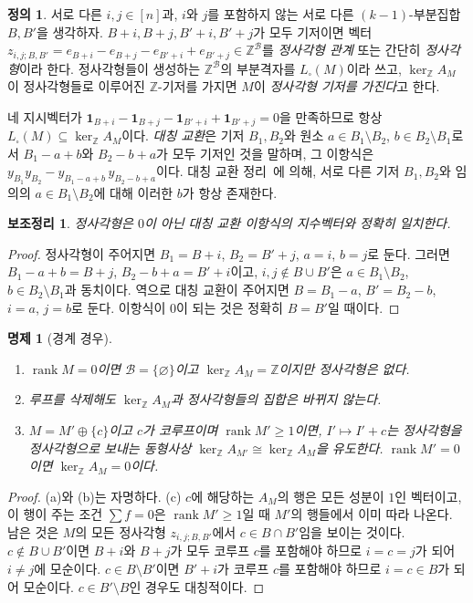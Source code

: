 \documentclass[11pt,a4paper]{article}
\theoremstyle{plain}
\newtheorem{lemma}[theorem]{보조정리}
\newtheorem{proposition}[theorem]{명제}
\theoremstyle{definition}
\newtheorem{definition}[theorem]{정의}
\newcommand{\Z}{\mathbb Z}
\newcommand{\AM}{A_M}
\newcommand{\kerZ}{\ker_{\Z}\!A_M}
\newcommand{\sq}{L_{\square}}
\newcommand{\bs}{\mathcal B}
\newcommand{\rank}{\operatorname{rank}}
\newcommand{\ind}{\mathbf 1}
\begin{document}
\begin{definition}\label{def:square}
서로 다른 $i,j\in[n]$과, $i$와 $j$를 포함하지 않는 서로 다른 $(k-1)$\nobreakdash-부분집합 $B,B'$을 생각하자. $B+i,B+j,B'+i,B'+j$가 모두 기저이면 벡터 $z_{i,j;B,B'}=e_{B+i}-e_{B+j}-e_{B'+i}+e_{B'+j}\in\Z^{\bs}$를 \emph{정사각형 관계} 또는 간단히 \emph{정사각형}이라 한다. 정사각형들이 생성하는 $\Z^{\bs}$의 부분격자를 $\sq(M)$이라 쓰고, $\kerZ$이 정사각형들로 이루어진 $\Z$\nobreakdash-기저를 가지면 $M$이 \emph{정사각형 기저를 가진다}고 한다.
\end{definition}
네 지시벡터가 $\ind_{B+i}-\ind_{B+j}-\ind_{B'+i}+\ind_{B'+j}=0$을 만족하므로 항상 $\sq(M)\subseteq\kerZ$이다. \emph{대칭 교환}은 기저 $B_1,B_2$와 원소 $a\in B_1\setminus B_2$, $b\in B_2\setminus B_1$로서 $B_1-a+b$와 $B_2-b+a$가 모두 기저인 것을 말하며, 그 이항식은 $y_{B_1}y_{B_2}-y_{B_1-a+b}\,y_{B_2-b+a}$이다. 대칭 교환 정리~\cite{Br69}에 의해, 서로 다른 기저 $B_1,B_2$와 임의의 $a\in B_1\setminus B_2$에 대해 이러한 $b$가 항상 존재한다.

\begin{lemma}\label{lem:sym}
정사각형은 $0$이 아닌 대칭 교환 이항식의 지수벡터와 정확히 일치한다.
\end{lemma}
\begin{proof}
정사각형이 주어지면 $B_1=B+i$, $B_2=B'+j$, $a=i$, $b=j$로 둔다. 그러면 $B_1-a+b=B+j$, $B_2-b+a=B'+i$이고, $i,j\notin B\cup B'$은 $a\in B_1\setminus B_2$, $b\in B_2\setminus B_1$과 동치이다. 역으로 대칭 교환이 주어지면 $B=B_1-a$, $B'=B_2-b$, $i=a$, $j=b$로 둔다. 이항식이 $0$이 되는 것은 정확히 $B=B'$일 때이다.
\end{proof}

\begin{proposition}[경계 경우]\label{prop:edge}
\begin{enumerate}[label=(\alph*),itemsep=1pt]
\item $\rank M=0$이면 $\bs=\{\varnothing\}$이고 $\kerZ=\Z$이지만 정사각형은 없다.
\item 루프를 삭제해도 $\kerZ$과 정사각형들의 집합은 바뀌지 않는다.
\item $M=M'\oplus\{c\}$이고 $c$가 코루프이며 $\rank M'\ge1$이면, $I'\mapsto I'+c$는 정사각형을 정사각형으로 보내는 동형사상 $\ker_\Z A_{M'}\cong\kerZ$을 유도한다. $\rank M'=0$이면 $\kerZ=0$이다.
\end{enumerate}
\end{proposition}
\begin{proof}
(a)와 (b)는 자명하다. (c) $c$에 해당하는 $\AM$의 행은 모든 성분이 $1$인 벡터이고, 이 행이 주는 조건 $\sum f=0$은 $\rank M'\ge1$일 때 $M'$의 행들에서 이미 따라 나온다. 남은 것은 $M$의 모든 정사각형 $z_{i,j;B,B'}$에서 $c\in B\cap B'$임을 보이는 것이다. $c\notin B\cup B'$이면 $B+i$와 $B+j$가 모두 코루프 $c$를 포함해야 하므로 $i=c=j$가 되어 $i\ne j$에 모순이다. $c\in B\setminus B'$이면 $B'+i$가 코루프 $c$를 포함해야 하므로 $i=c\in B$가 되어 모순이다. $c\in B'\setminus B$인 경우도 대칭적이다.
\end{proof}
\end{document}
